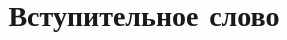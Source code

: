 \documentclass[final,pdftex]{../../template/epsilonj}
\begin{document}
\setcounter{page}{2}

\begin{frontmatter}
\title{Вступительное слово}

\begin{aug}
\author{ }%



\end{aug}

\begin{abstract}
\end{abstract}


\end{frontmatter}


\end{document}

